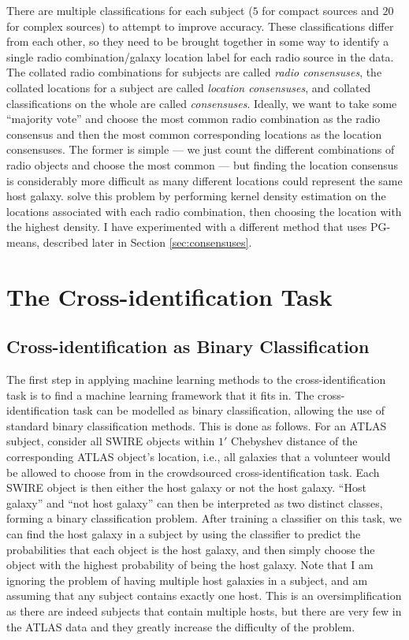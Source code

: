 \documentclass[a4paper]{article}
\newcommand{\sect}{Section }
\begin{document}
      There are multiple classifications for each subject ($5$ for compact sources and $20$ for complex sources) to attempt to improve accuracy. These classifications differ from each other, so they need to be brought together in some way to identify a single radio combination/galaxy location label for each radio source in the data. The collated radio combinations for subjects are called \emph{radio consensuses}, the collated locations for a subject are called \emph{location consensuses}, and collated classifications on the whole are called \emph{consensuses}. Ideally, we want to take some ``majority vote'' and choose the most common radio combination as the radio consensus and then the most common corresponding locations as the location consensuses. The former is simple --- we just count the different combinations of radio objects and choose the most common --- but finding the location consensus is considerably more difficult as many different locations could represent the same host galaxy. \citet{banfield15} solve this problem by performing kernel density estimation on the locations associated with each radio combination, then choosing the location with the highest density. I have experimented with a different method that uses PG-means\cite{hamerly07}, described later in \sect \ref{sec:consensuses}.


  \section{The Cross-identification Task}

    \subsection{Cross-identification as Binary Classification}

      The first step in applying machine learning methods to the cross-identification task is to find a machine learning framework that it fits in. The cross-identification task can be modelled as binary classification, allowing the use of standard binary classification methods. This is done as follows. For an ATLAS subject, consider all SWIRE objects within $1'$ Chebyshev distance of the corresponding ATLAS object's location, i.e., all galaxies that a volunteer would be allowed to choose from in the crowdsourced cross-identification task. Each SWIRE object is then either the host galaxy or not the host galaxy. ``Host galaxy'' and ``not host galaxy'' can then be interpreted as two distinct classes, forming a binary classification problem. After training a classifier on this task, we can find the host galaxy in a subject by using the classifier to predict the probabilities that each object is the host galaxy, and then simply choose the object with the highest probability of being the host galaxy. Note that I am ignoring the problem of having multiple host galaxies in a subject, and am assuming that any subject contains exactly one host. This is an oversimplification as there are indeed subjects that contain multiple hosts, but there are very few in the ATLAS data and they greatly increase the difficulty of the problem.
\end{document}
